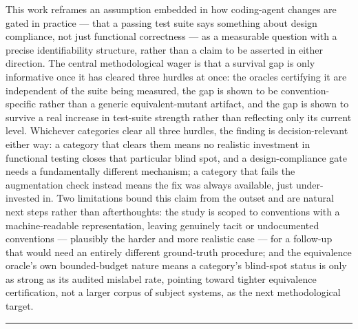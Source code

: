 \documentclass[11pt]{article}
\begin{document}
This work reframes an assumption embedded in how coding-agent changes are gated in practice --- that a passing test suite says something about design compliance, not just functional correctness --- as a measurable question with a precise identifiability structure, rather than a claim to be asserted in either direction. The central methodological wager is that a survival gap is only informative once it has cleared three hurdles at once: the oracles certifying it are independent of the suite being measured, the gap is shown to be convention-specific rather than a generic equivalent-mutant artifact, and the gap is shown to survive a real increase in test-suite strength rather than reflecting only its current level. Whichever categories clear all three hurdles, the finding is decision-relevant either way: a category that clears them means no realistic investment in functional testing closes that particular blind spot, and a design-compliance gate needs a fundamentally different mechanism; a category that fails the augmentation check instead means the fix was always available, just under-invested in. Two limitations bound this claim from the outset and are natural next steps rather than afterthoughts: the study is scoped to conventions with a machine-readable representation, leaving genuinely tacit or undocumented conventions --- plausibly the harder and more realistic case --- for a follow-up that would need an entirely different ground-truth procedure; and the equivalence oracle's own bounded-budget nature means a category's blind-spot status is only as strong as its audited mislabel rate, pointing toward tighter equivalence certification, not a larger corpus of subject systems, as the next methodological target.

\vspace{1em}
\hrule
\vspace{1em}
\end{document}
